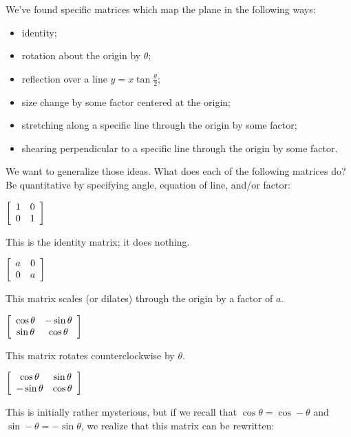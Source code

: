\documentclass[../key.tex]{subfiles}
\begin{document}
\begin{outer_problem}
\item We've found specific matrices which map the plane in the following ways:
\begin{itemize}
\item identity;
\item rotation about the origin by $\theta$;
\item reflection over a line $y=x \tan\frac{\theta}{2}$;
\item size change by some factor centered at the origin;
\item stretching along a specific line through the origin by some factor;
\item shearing perpendicular to a specific line through the origin by some factor.
\end{itemize}
We want to generalize those ideas. What does each of the following matrices do? Be quantitative by specifying angle, equation of line, and/or factor:\label{prob:list_transformations}
\end{outer_problem}

\begin{inner_problem}[start=1]
\item $\left[\begin{array}{cc} 1 & 0 \\ 0 & 1 \end{array}\right]$ \label{prob:list_transformations_part_start}
\end{inner_problem}

This is the identity matrix; it does nothing.

\begin{inner_problem}
\item $\left[\begin{array}{cc} a & 0 \\ 0 & a \end{array}\right]$
\end{inner_problem}

This matrix scales (or dilates) through the origin by a factor of $a$.

\begin{inner_problem}
\item $\left[\begin{array}{cc} \cos\theta & -\sin\theta \\ \sin\theta & \cos\theta \end{array}\right]$
\end{inner_problem}

This matrix rotates counterclockwise by $\theta$.

\begin{inner_problem}
\item $\left[\begin{array}{cc} \cos\theta & \sin\theta \\ -\sin\theta & \cos\theta \end{array}\right]$
\end{inner_problem}

This is initially rather mysterious, but if we recall that $\cos\theta = \cos-\theta$ and $\sin-\theta = -\sin\theta$, we realize that this matrix can be rewritten:
\end{document}

